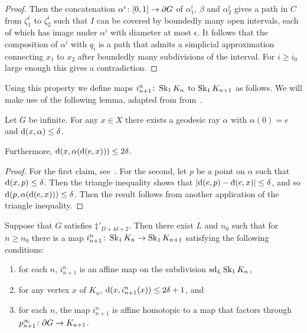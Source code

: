 \documentclass[a4paper]{article}
\begin{document}
\begin{proof}
  Then the concatenation $\alpha^i\colon[0,1]\to \partial G$ of $\alpha_1^i$,
  $\beta$ and $\alpha_2^i$ gives a path in $C$ from $\zeta_1^i$ to $\zeta_2^i$
  such that $I$ can be covered by boundedly many open intervals, each of which
  has image under $\alpha^i$ with diameter at most $\epsilon$. It follows that
  the composition of $\alpha^i$ with $q_i$ is a path that admits a simplicial
  approximation connecting $x_1$ to $x_2$ after boundedly many subdivisions of
  the interval. For $i \geq i_0$ large enough this gives a contradiction.
\end{proof}

Using this property we define maps $i^n_{n+1}\colon \operatorname{Sk}_1 K_n$ to
$\operatorname{Sk}_1K_{n+1}$ as follows.  We will make use of the following lemma, adapted
from from~\cite{bestvinamess91}.

\begin{lemma}\cite{bestvinamess91}\label{lem:near_geod_rays}
  Let $G$ be infinite. For any $x \in X$ there exists a geodesic ray $\alpha$ 
  with $\alpha(0) = e$ and $\operatorname{d}(x,\alpha) \leq \delta$. 
  
  Furthermore, $\operatorname{d}(x, \alpha(\operatorname{d}(e,x))) \leq 2\delta$.
\end{lemma}

\begin{proof}
  For the first claim, see~\cite{bestvinamess91}. For the second, let $p$ be a 
  point on $\alpha$ such that $\operatorname{d}(x, p) \leq \delta$. Then the triangle 
  inequality shows that $\left|\operatorname{d}(e,p) - \operatorname{d}(e,x)\right| \leq \delta$, and 
  so $\operatorname{d}(p, \alpha(\operatorname{d}(e,x))) \leq \delta$. Then the result 
  follows from another application of the triangle inequality.
\end{proof}

\begin{proposition}\label{prop:i_in_dimension_1}
  Suppose that $G$ satisfies $\ddag'_{D + 4\delta+2}$. Then there exist $L$ and
  $n_0$ such that for $n\geq n_0$ there is a map $i^n_{n+1}\colon \operatorname{Sk}_1 K_n
  \to \operatorname{Sk}_1 K_{n+1}$ satisfying the following conditions:
  \begin{enumerate}
    \item for each $n$, $i^n_{n+1}$ is an affine map on the subdivision
      $\operatorname{sd}_L\operatorname{Sk}_1 K_n$,
    \item for any vertex $x$ of $K_n$, $\operatorname{d}(x, i^n_{n+1}(x)) \leq 2\delta+1$,
      and
    \item for each $n$, the map $i^n_{n+1}$ is affine homotopic to a map that
      factors through $p^\infty_{n+1}\colon \partial G \to K_{n+1}$.
  \end{enumerate}
\end{proposition}
\end{document}
